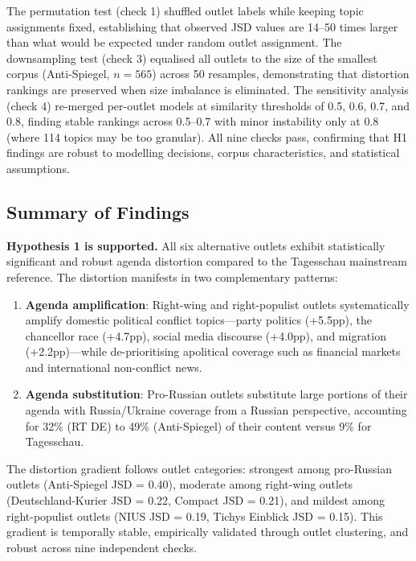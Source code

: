 The permutation test (check 1) shuffled outlet labels while keeping topic assignments fixed, establishing that observed JSD values are 14--50 times larger than what would be expected under random outlet assignment. The downsampling test (check 3) equalised all outlets to the size of the smallest corpus (Anti-Spiegel, $n = 565$) across 50 resamples, demonstrating that distortion rankings are preserved when size imbalance is eliminated. The sensitivity analysis (check 4) re-merged per-outlet models at similarity thresholds of 0.5, 0.6, 0.7, and 0.8, finding stable rankings across 0.5--0.7 with minor instability only at 0.8 (where 114 topics may be too granular). All nine checks pass, confirming that H1 findings are robust to modelling decisions, corpus characteristics, and statistical assumptions.

\subsection{Summary of Findings}

\textbf{Hypothesis 1 is supported.} All six alternative outlets exhibit statistically significant and robust agenda distortion compared to the Tagesschau mainstream reference. The distortion manifests in two complementary patterns:

\begin{enumerate}
    \item \textbf{Agenda amplification}: Right-wing and right-populist outlets systematically amplify domestic political conflict topics---party politics (+5.5pp), the chancellor race (+4.7pp), social media discourse (+4.0pp), and migration (+2.2pp)---while de-prioritising apolitical coverage such as financial markets and international non-conflict news.

    \item \textbf{Agenda substitution}: Pro-Russian outlets substitute large portions of their agenda with Russia/Ukraine coverage from a Russian perspective, accounting for 32\% (RT DE) to 49\% (Anti-Spiegel) of their content versus 9\% for Tagesschau.
\end{enumerate}

The distortion gradient follows outlet categories: strongest among pro-Russian outlets (Anti-Spiegel JSD = 0.40), moderate among right-wing outlets (Deutschland-Kurier JSD = 0.22, Compact JSD = 0.21), and mildest among right-populist outlets (NIUS JSD = 0.19, Tichys Einblick JSD = 0.15). This gradient is temporally stable, empirically validated through outlet clustering, and robust across nine independent checks.
